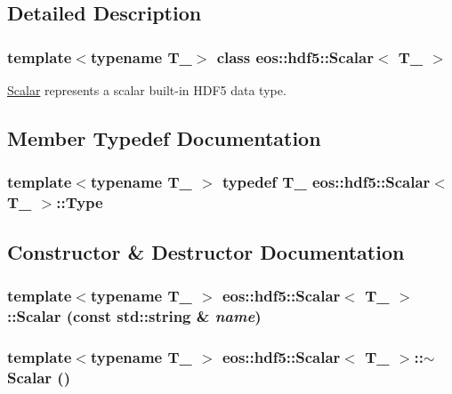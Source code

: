 \subsection{Detailed Description}
\subsubsection*{template$<$typename T\_\-$>$ class eos::hdf5::Scalar$<$ T\_\- $>$}

\hyperlink{classeos_1_1hdf5_1_1Scalar}{Scalar} represents a scalar built-\/in HDF5 data type. 

\subsection{Member Typedef Documentation}
\hypertarget{classeos_1_1hdf5_1_1Scalar_a614de8b7185b626dad906cf347b86f92}{
\subsubsection[{Type}]{\setlength{\rightskip}{0pt plus 5cm}template$<$typename T\_\- $>$ typedef T\_\- {\bf eos::hdf5::Scalar}$<$ T\_\- $>$::{\bf Type}}}
\label{classeos_1_1hdf5_1_1Scalar_a614de8b7185b626dad906cf347b86f92}


\subsection{Constructor \& Destructor Documentation}
\hypertarget{classeos_1_1hdf5_1_1Scalar_ab242719c82cdf865766b1e97d8c9666a}{
\subsubsection[{Scalar}]{\setlength{\rightskip}{0pt plus 5cm}template$<$typename T\_\- $>$ {\bf eos::hdf5::Scalar}$<$ T\_\- $>$::{\bf Scalar} (const std::string \& {\em name})}}
\label{classeos_1_1hdf5_1_1Scalar_ab242719c82cdf865766b1e97d8c9666a}
\hypertarget{classeos_1_1hdf5_1_1Scalar_a7bc85bf7ef7d9488df0953597bf3254a}{
\subsubsection[{$\sim$Scalar}]{\setlength{\rightskip}{0pt plus 5cm}template$<$typename T\_\- $>$ {\bf eos::hdf5::Scalar}$<$ T\_\- $>$::$\sim${\bf Scalar} ()}}
\label{classeos_1_1hdf5_1_1Scalar_a7bc85bf7ef7d9488df0953597bf3254a}


